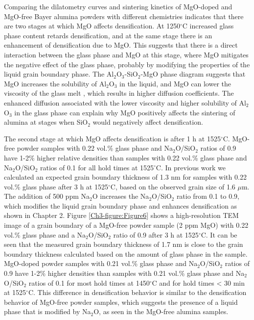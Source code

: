 Comparing the dilatometry curves and sintering kinetics of MgO-doped and MgO-free Bayer alumina powders with different chemistries indicates that there are two stages at which MgO affects densification. At 1250$^{\circ}$C increased glass phase content retards densification, and at the same stage there is an enhancement of densification due to MgO. This suggests that there is a direct interaction between the glass phase and MgO at this stage, where MgO mitigates the negative effect of the glass phase, probably by modifying the properties of the liquid grain boundary phase. The Al$_{2}$O$_{3}$-SiO$_{2}$-MgO phase diagram suggests that MgO increases the solubility of Al$_{2}$O$_{3}$ in the liquid, and MgO can lower the viscosity of the glass melt \cite{Wu2015}, which results in higher diffusion coefficients. The enhanced diffusion associated with the lower viscosity and higher solubility of Al$_{2}$O$_{3}$ in the glass phase can explain why MgO positively affects the sintering of alumina at stages when SiO$_{2}$ would negatively affect densification. 

The second stage at which MgO affects densification is after 1 h at 1525$^{\circ}$C. MgO-free powder samples with 0.22 vol.\% glass phase and Na$_{2}$O/SiO$_{2}$ ratios of 0.9 have 1-2\% higher relative densities than samples with 0.22 vol.\% glass phase and Na$_{2}$O/SiO$_{2}$ ratios of 0.1 for all hold times at 1525$^{\circ}$C. In previous work we calculated an expected grain boundary thickness of 1.3 nm for samples with 0.22 vol.\% glass phase after 3 h at 1525$^{\circ}$C, based on the observed grain size of 1.6 $\mu$m. The addition of 500 ppm Na$_{2}$O increases the Na$_{2}$O/SiO$_{2}$ ratio from 0.1 to 0.9, which modifies the liquid grain boundary phase and enhances densification as shown in Chapter 2. Figure \ref{Ch3-figure:Figure6} shows a high-resolution TEM image of a grain boundary of a MgO-free powder sample (2 ppm MgO) with 0.22 vol.\% glass phase and a Na$_{2}$O/SiO$_{2}$ ratio of 0.9 after 3 h at 1525$^{\circ}$C. It can be seen that the measured grain boundary thickness of 1.7 nm is close to the grain boundary thickness calculated based on the amount of glass phase in the sample. MgO-doped powder samples with 0.21 vol.\% glass phase and Na$_{2}$O/SiO$_{2}$ ratios of 0.9 have 1-2\% higher densities than samples with 0.21 vol.\% glass phase and Na$_{2}$O/SiO$_{2}$ ratios of 0.1 for most hold times at 1450$^{\circ}$C and for hold times < 30 min at 1525$^{\circ}$C. This difference in densification behavior is similar to the densification behavior of MgO-free powder samples, which suggests the presence of a liquid phase that is modified by Na$_{2}$O, as seen in the MgO-free alumina samples. 

